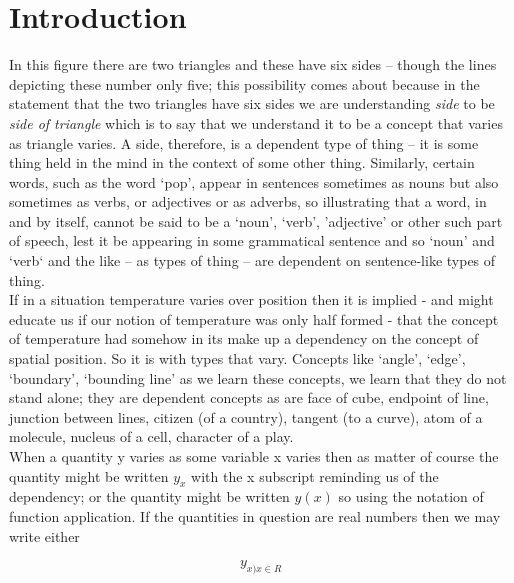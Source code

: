 \documentclass[10pt,a4paper]{scrartcl}
\begin{document}
\section{Introduction}
\noindent In this figure
\raisebox{-0.5cm}{
\pspicture(0,-0.1)(1.1,1)
\psline(0,0)(0,1)(1,1)(1,0)(0,0)
\psline (0,0)(1,1)
\endpspicture
}
there are two triangles and these have six sides -- though the lines depicting these number only five; 
this possibility comes about
because in the statement that the two triangles have six sides we are understanding \textit{side}
to be \textit{side of triangle} which is to say that we understand it to be a concept that varies as
triangle varies. A side, therefore, is a dependent type of thing -- it is some thing held in the mind
in the context of some other thing. 
Similarly, certain words, such as the word `pop', appear in sentences sometimes as
nouns but also sometimes as verbs, or adjectives or as adverbs, so illustrating that a word, in and by itself, cannot be said to 
be a `noun', `verb', 'adjective' or other such part of speech,  lest it be appearing in some grammatical sentence and so `noun' and `verb`
and the like -- as types of thing -- are dependent on sentence-like types of thing.  \\

\noindent If in a situation temperature varies over position then it is implied - and might educate us if our notion of temperature was only half formed - that the concept of temperature had somehow in its make up a dependency on the concept of spatial position. 
So it is  with types that vary. 
Concepts like `angle', `edge', `boundary', `bounding line' as we learn these concepts,
we learn that they do not stand alone; they are dependent concepts as are  face of cube,  endpoint of line,   junction between lines, citizen (of a country), tangent (to a curve), atom of a molecule,  nucleus of a cell, character of a play. \\

\noindent  When a quantity y varies as some variable x varies then as matter of course the quantity might be written $y_{x}$ with the x subscript  reminding us of the dependency; or the quantity might be written $y(x)$ so using the notation of function application.  
If the quantities in question are real numbers then we may write either

\begin{equation*}
y_{x)x\in R}
\end{equation*}
\end{document}
